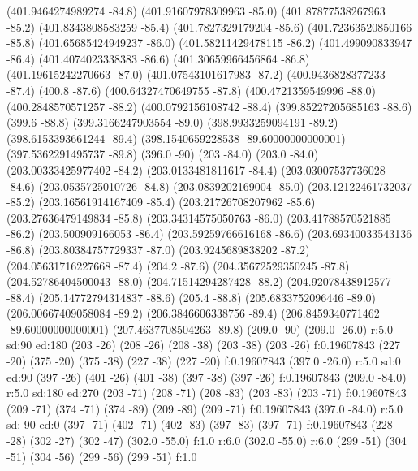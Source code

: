 {\lvec (401.9464274989274 -84.8)
\lvec (401.91607978309963 -85.0)
\lvec (401.87877538267963 -85.2)
\lvec (401.8343808583259 -85.4)
\lvec (401.7827329179204 -85.6)
\lvec (401.72363520850166 -85.8)
\lvec (401.65685424949237 -86.0)
\lvec (401.58211429478115 -86.2)
\lvec (401.499090833947 -86.4)
\lvec (401.4074023338383 -86.6)
\lvec (401.30659966456864 -86.8)
\lvec (401.19615242270663 -87.0)
\lvec (401.07543101617983 -87.2)
\lvec (400.9436828377233 -87.4)
\lvec (400.8 -87.6)
\lvec (400.64327470649755 -87.8)
\lvec (400.4721359549996 -88.0)
\lvec (400.2848570571257 -88.2)
\lvec (400.0792156108742 -88.4)
\lvec (399.85227205685163 -88.6)
\lvec (399.6 -88.8)
\lvec (399.3166247903554 -89.0)
\lvec (398.9933259094191 -89.2)
\lvec (398.6153393661244 -89.4)
\lvec (398.1540659228538 -89.60000000000001)
\lvec (397.5362291495737 -89.8)
\lvec (396.0 -90)
\move (203 -84.0)
\lvec (203.0 -84.0)
\lvec (203.00333425977402 -84.2)
\lvec (203.0133481811617 -84.4)
\lvec (203.03007537736028 -84.6)
\lvec (203.0535725010726 -84.8)
\lvec (203.0839202169004 -85.0)
\lvec (203.12122461732037 -85.2)
\lvec (203.16561914167409 -85.4)
\lvec (203.21726708207962 -85.6)
\lvec (203.27636479149834 -85.8)
\lvec (203.34314575050763 -86.0)
\lvec (203.41788570521885 -86.2)
\lvec (203.500909166053 -86.4)
\lvec (203.59259766616168 -86.6)
\lvec (203.69340033543136 -86.8)
\lvec (203.80384757729337 -87.0)
\lvec (203.9245689838202 -87.2)
\lvec (204.05631716227668 -87.4)
\lvec (204.2 -87.6)
\lvec (204.35672529350245 -87.8)
\lvec (204.52786404500043 -88.0)
\lvec (204.71514294287428 -88.2)
\lvec (204.92078438912577 -88.4)
\lvec (205.14772794314837 -88.6)
\lvec (205.4 -88.8)
\lvec (205.6833752096446 -89.0)
\lvec (206.00667409058084 -89.2)
\lvec (206.3846606338756 -89.4)
\lvec (206.8459340771462 -89.60000000000001)
\lvec (207.4637708504263 -89.8)
\lvec (209.0 -90)
\move(209.0 -26.0)
\larc r:5.0 sd:90 ed:180
\move (203 -26)
\lvec (208 -26)
\lvec (208 -38)
\lvec (203 -38)
\lvec (203 -26)
\lfill f:0.19607843
\move (227 -20)
\lvec (375 -20)
\lvec (375 -38)
\lvec (227 -38)
\lvec (227 -20)
\lfill f:0.19607843
\move(397.0 -26.0)
\larc r:5.0 sd:0 ed:90
\move (397 -26)
\lvec (401 -26)
\lvec (401 -38)
\lvec (397 -38)
\lvec (397 -26)
\lfill f:0.19607843
\move(209.0 -84.0)
\larc r:5.0 sd:180 ed:270
\move (203 -71)
\lvec (208 -71)
\lvec (208 -83)
\lvec (203 -83)
\lvec (203 -71)
\lfill f:0.19607843
\move (209 -71)
\lvec (374 -71)
\lvec (374 -89)
\lvec (209 -89)
\lvec (209 -71)
\lfill f:0.19607843
\move(397.0 -84.0)
\larc r:5.0 sd:-90 ed:0
\move (397 -71)
\lvec (402 -71)
\lvec (402 -83)
\lvec (397 -83)
\lvec (397 -71)
\lfill f:0.19607843
\htext (228 -28) {\matrixfontselect \color{white}{Binary Search Tree}}
\move (302 -27)
\lvec (302 -47)
\move(302.0 -55.0)
\fcir f:1.0 r:6.0
\move(302.0 -55.0)
\lcir r:6.0
\move (299 -51)
\lvec (304 -51)
\lvec (304 -56)
\lvec (299 -56)
\lvec (299 -51)
\lfill f:1.0
}
